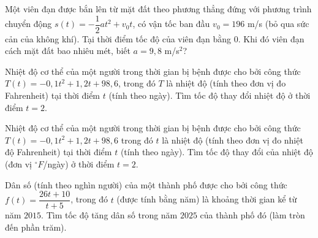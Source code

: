 \begin{ex}%
	Một viên đạn được bắn lên từ mặt đất theo phương thẳng đứng với phương trình chuyển động $s(t)=-\dfrac{1}{2}a{t^2}+v_0t$, có vận tốc ban đầu $v_0=196$ m/s (bỏ qua sức cản của không khí). Tại thời điểm tốc độ của viên đạn  bằng $0$. Khi đó viên đạn cách mặt đất bao nhiêu mét, biết $a=9{,}8$ m/s$^2$?
\end{ex}

\begin{ex}%
	Nhiệt độ cơ thể của một người trong thời gian bị bệnh được cho bởi công thức $T(t)=-0{,}1t^2+1{,}2t+98{,}6$, trong đó $T$ là nhiệt độ (tính theo đơn vị đo Fahrenheit) tại  thời điểm $t$ (tính theo ngày). Tìm tốc độ thay đổi nhiệt độ ở thời điểm $t=2$.
\end{ex}

\begin{ex}%
	Nhiệt độ cơ thể của một người trong thời gian bị bệnh được cho  bởi công thức $T(t)=-0{,}1t^2+1{,}2t+98{,}6$ trong đó $t$ là nhiệt độ (tính theo đơn vị đo nhiệt độ Fahrenheit) tại thời điểm $t$ (tính theo ngày). Tìm tốc độ thay đổi của nhiệt độ (đơn vị $^\circ F$/ngày) ở thời điểm $t=2$.
\end{ex}

\begin{ex}%
	Dân số (tính theo nghìn người) của  một thành phố được cho bởi công thức $f(t)=\dfrac{26 t+10}{t+5}$, trong đó $t$ (được tính bằng năm) là khoảng thời gian kể từ năm $2015$. Tìm tốc độ tăng dân số trong năm $2025$ của thành phố đó (làm tròn đến phần trăm).
\end{ex}

